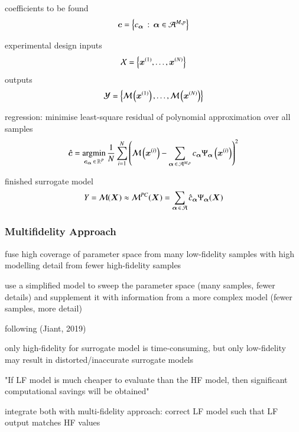coefficients to be found
\begin{equation}
    \bm c = \left\{c_{\bm{\alpha}} \,:\, {\bm{\alpha}} \in \mathcal{A}^{M,p}\right\}
\end{equation}

experimental design
inputs
\begin{equation}
    \mathcal{X} = \left\{ \bm x^{(1)},\dots,\bm x^{(N)} \right\}
\end{equation}
outputs
\begin{equation}
    \mathcal{Y} = \left\{ \mathcal{M}\left(\bm x^{(1)}\right),\dots,\mathcal{M}\left(\bm x^{(N)}\right) \right\}
\end{equation}

regression: minimise least-square residual of polynomial approximation over all samples
\begin{equation}
    \hat{\bm{c}} = \operatorname*{\arg\!\min}_{\bm{c}_{\bm{\alpha}} \,\in\, \mathbb{R}^P} \frac{1}{N} \sum_{i=1}^N \left(
        \mathcal{M} \left(\bm x^{(i)}\right) - \sum_{{\bm{\alpha}} \,\in\, \mathcal{A}^{M,p}} c_{\bm{\alpha}} \Psi_{\bm{\alpha}}\left(\bm x^{(i)}\right)
    \right)^2
\end{equation}

finished surrogate model
\begin{equation}
    Y = \mathcal{M}(\bm X) \approx \mathcal{M}^{PC}(\bm X) = \sum_{{\bm{\alpha}} \,\in\, \mathcal{A}} \hat{c}_{\bm{\alpha}} \Psi_{\bm{\alpha}} (\bm X)
\end{equation}

\subsubsection{Multifidelity Approach}

\cite{palar_multi-fidelity_2016}
\cite{ng_multifidelity_2012}
\cite{berchier_multi-fidelity_nodate}

fuse high coverage of parameter space from many low-fidelity samples with
high modelling detail from fewer high-fidelity samples

use a simplified model to sweep the parameter space (many samples, fewer details)
and supplement it with information from a more complex model (fewer samples, more detail)

following (Jiant, 2019)

only high-fidelity for surrogate model is time-consuming,
but only low-fidelity may result in distorted/inaccurate surrogate models

"If LF model is much cheaper to evaluate than the HF model, then significant
computational savings will be obtained" \cite{ng_multifidelity_2012}

integrate both with multi-fidelity approach: correct LF model such that LF output matches HF values

